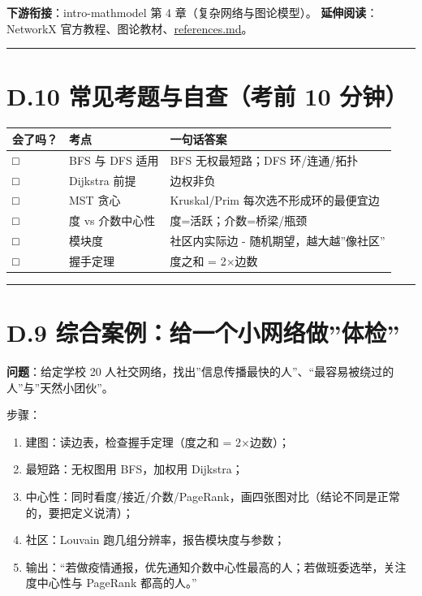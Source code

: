 \textbf{下游衔接}：intro-mathmodel 第 4 章（复杂网络与图论模型）。
\textbf{延伸阅读}：NetworkX
官方教程、图论教材、\href{./references.md}{references.md}。

\begin{center}\rule{0.5\linewidth}{0.5pt}\end{center}

\section{D.10 常见考题与自查（考前 10
分钟）}\label{d.10-ux5e38ux89c1ux8003ux9898ux4e0eux81eaux67e5ux8003ux524d-10-ux5206ux949f}

{\def\LTcaptype{none} %
\begin{longtable}[]{@{}lll@{}}
\toprule\noalign{}
会了吗？ & 考点 & 一句话答案 \\
\midrule\noalign{}
\endhead
\bottomrule\noalign{}
\endlastfoot
□ & BFS 与 DFS 适用 & BFS 无权最短路；DFS 环/连通/拓扑 \\
□ & Dijkstra 前提 & 边权非负 \\
□ & MST 贪心 & Kruskal/Prim 每次选不形成环的最便宜边 \\
□ & 度 vs 介数中心性 & 度=活跃；介数=桥梁/瓶颈 \\
□ & 模块度 & 社区内实际边 - 随机期望，越大越''像社区'' \\
□ & 握手定理 & 度之和 = 2×边数 \\
\end{longtable}
}

\begin{center}\rule{0.5\linewidth}{0.5pt}\end{center}

\section{D.9
综合案例：给一个小网络做''体检''}\label{d.9-ux7efcux5408ux6848ux4f8bux7ed9ux4e00ux4e2aux5c0fux7f51ux7edcux505aux4f53ux68c0}

\textbf{问题}：给定学校 20
人社交网络，找出''信息传播最快的人''、``最容易被绕过的人''与''天然小团伙''。

步骤：

\begin{enumerate}
\def\labelenumi{\arabic{enumi}.}
\tightlist
\item
  建图：读边表，检查握手定理（度之和 = 2×边数）；
\item
  最短路：无权图用 BFS，加权用 Dijkstra；
\item
  中心性：同时看度/接近/介数/PageRank，画四张图对比（结论不同是正常的，要把定义说清）；
\item
  社区：Louvain 跑几组分辨率，报告模块度与参数；
\item
  输出：``若做疫情通报，优先通知介数中心性最高的人；若做班委选举，关注度中心性与
  PageRank 都高的人。''
\end{enumerate}


